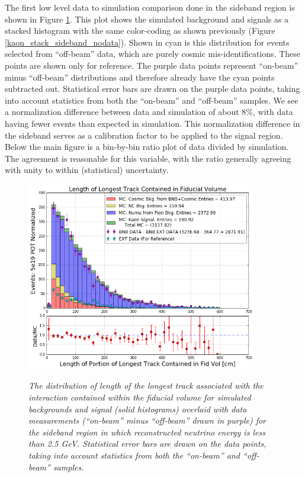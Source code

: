 The first low level data to simulation comparison done in the sideband region is shown in Figure \ref{kaon_sideband_comp_tracklength}. This plot shows the simulated background and signals as a stacked histogram with the same color-coding as shown previously (Figure \ref{kaon_stack_sideband_nodata}). Shown in cyan is this distribution for events selected from ``off-beam'' data, which are purely cosmic mis-identifications. These points are shown only for reference. The purple data points represent ``on-beam'' minus ``off-beam'' distributions and therefore already have the cyan points subtracted out. Statistical error bars are drawn on the purple data points, taking into account statistics from both the ``on-beam'' and ``off-beam'' samples. We see a normalization difference between data and simulation of about 8\%, with data having fewer events than expected in simulation. This normalization difference in the sideband serves as a calibration factor to be applied to the signal region. Below the main figure is a bin-by-bin ratio plot of data divided by simulation. The agreement is reasonable for this variable, with the ratio generally agreeing with unity to within (statistical) uncertainty.\\


\begin{figure}[ht!]
\centering
	\includegraphics[width=0.9\textwidth]{Figures/kaon_sideband_comp_tracklength.png} \\
\caption{\textit{The distribution of length of the longest track associated with the interaction contained within the fiducial volume for simulated backgrounds and signal (solid histograms) overlaid with data measurements (``on-beam'' minus ``off-beam'' drawn in purple) for the sideband region in which reconstructed neutrino energy is less than 2.5 GeV. Statistical error bars are drawn on the data points, taking into account statistics from both the ``on-beam'' and ``off-beam'' samples.}}\label{kaon_sideband_comp_tracklength}
\end{figure}

